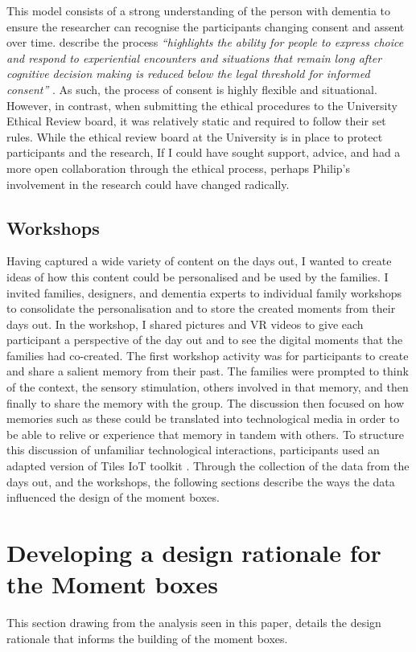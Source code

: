This model consists of a strong understanding of the person with dementia to ensure the researcher can recognise the participants changing consent and assent over time. \cite{haraldsdottir2019relational} describe the process \textit{``highlights the ability for people to express choice and respond to experiential encounters and situations that remain long after cognitive decision making is reduced below the legal threshold for informed consent''} \citep[pg. 4]{haraldsdottir2019relational}. As such, the process of consent is highly flexible and situational. However, in contrast, when submitting the ethical procedures to the University Ethical Review board, it was relatively static and required to follow their set rules. While the ethical review board at the University is in place to protect participants and the research, If I could have sought support, advice, and had a more open collaboration through the ethical process, perhaps Philip's involvement in the research could have changed radically.

\subsection{Workshops}
\label{workshops}
Having captured a wide variety of content on the days out, I wanted to create ideas of how this content could be personalised and be used by the families. I invited families, designers, and dementia experts to individual family workshops to consolidate the personalisation and to store the created moments from their days out. In the workshop, I shared pictures and VR videos to give each participant a perspective of the day out and to see the digital moments that the families had co-created. The first workshop activity was for participants to create and share a salient memory from their past. The families were prompted to think of the context, the sensory stimulation, others involved in that memory, and then finally to share the memory with the group. The discussion then focused on how memories such as these could be translated into technological media in order to be able to relive or experience that memory in tandem with others. To structure this discussion of unfamiliar technological interactions, participants used an adapted version of Tiles IoT toolkit \citep{mora2017tiles}. Through the collection of the data from the days out, and the workshops, the following sections describe the ways the data influenced the design of the moment boxes.


\section{Developing a design rationale for the Moment boxes}
\label{DesignRationale}
This section drawing from the analysis seen in this paper, details the design rationale that informs the building of the moment boxes. 

